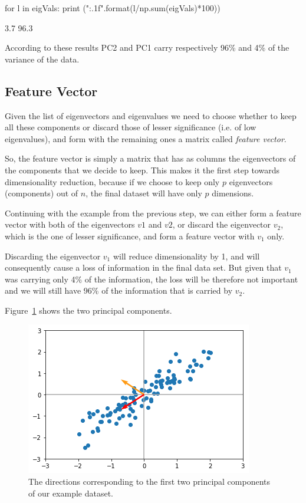 \begin{ipython}
for l in eigVals:
    print ("{:.1f}".format(l/np.sum(eigVals)*100))
\end{ipython}
\begin{ioutput}
3.7
96.3
\end{ioutput}

According to these results PC2 and PC1 carry respectively 96\% and 4\% of the variance of the data.

\subsection{Feature Vector}
Given the list of eigenvectors and eigenvalues we need to choose whether to keep all these components or discard those of lesser significance (i.e. of low eigenvalues), and form with the remaining ones a matrix called \emph{feature vector}.

So, the feature vector is simply a matrix that has as columns the eigenvectors of the components that we decide to keep. This makes it the first step towards dimensionality reduction, because if we choose to keep only $p$ eigenvectors (components) out of $n$, the final dataset will have only $p$ dimensions.

Continuing with the example from the previous step, we can either form a feature vector with both of the eigenvectors $v1$ and $v2$, or discard the eigenvector $v_2$, which is the one of lesser significance, and form a feature vector with $v_1$ only.

Discarding the eigenvector $v_1$ will reduce dimensionality by 1, and will consequently cause a loss of information in the final data set. But given that $v_1$ was carrying only 4\% of the information, the loss will be therefore not important and we will still have 96\% of the information that is carried by $v_2$.

Figure~\ref{fig:pca_result} shows the two principal components.

\begin{figure}[htb]
	\centering
	\includegraphics[width=0.7\linewidth]{figures/pca_result}
	\caption{The directions corresponding to the first two principal 
		components of our example dataset.}
	\label{fig:pca_result}
\end{figure}

